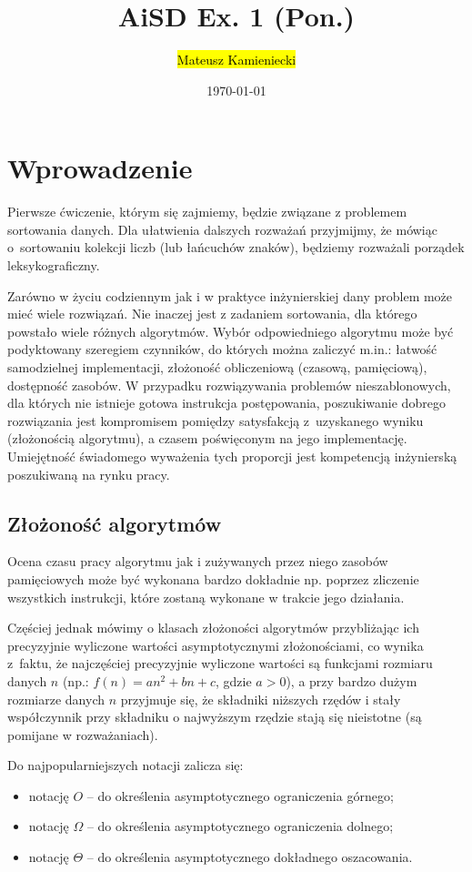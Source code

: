\documentclass[twoside]{article}
\title{AiSD Ex. 1 (Pon.)}
\author{\hl{Mateusz Kamieniecki}}
\date{\today}
\begin{document}
\pagestyle{fancy}
\fancyhead{}
\fancyhead[L]{\@title}
\fancyhead[R]{\@author}
\fancyhead[C]{\@date}

\cfoot{\thepage\ / \pageref{LastPage}}


\newpage

\section{Wprowadzenie}
Pierwsze ćwiczenie, którym się zajmiemy, będzie związane z problemem sortowania danych.
Dla ułatwienia dalszych rozważań przyjmijmy, że mówiąc o~sortowaniu kolekcji liczb (lub łańcuchów znaków), 
będziemy rozważali porządek leksykograficzny.

Zarówno w życiu codziennym jak i w praktyce inżynierskiej dany problem może mieć wiele rozwiązań.
Nie inaczej jest z zadaniem sortowania, dla którego powstało wiele różnych algorytmów.
Wybór odpowiedniego algorytmu może być podyktowany szeregiem czynników, do których można zaliczyć 
m.in.: łatwość samodzielnej implementacji, złożoność obliczeniową (czasową, pamięciową), 
dostępność zasobów.
W przypadku rozwiązywania problemów nieszablonowych, dla których nie istnieje gotowa instrukcja
postępowania, poszukiwanie dobrego rozwiązania jest kompromisem pomiędzy satysfakcją 
z~uzyskanego wyniku (złożonością algorytmu), a czasem poświęconym na jego implementację.
Umiejętność świadomego wyważenia tych proporcji jest kompetencją inżynierską poszukiwaną 
na rynku pracy.

\subsection{Złożoność algorytmów}
Ocena czasu pracy algorytmu jak i zużywanych przez niego zasobów pamięciowych może być wykonana bardzo dokładnie
np. poprzez zliczenie wszystkich instrukcji, które zostaną wykonane w trakcie jego działania.

Częściej jednak mówimy o klasach złożoności algorytmów przybliżając ich precyzyjnie wyliczone wartości
asymptotycznymi złożonościami, co wynika z~faktu, że najczęściej precyzyjnie wyliczone wartości 
są funkcjami rozmiaru danych $n$ (np.: $f(n) = an^2 + bn + c$, gdzie $a > 0$), a przy bardzo dużym rozmiarze danych
$n$ przyjmuje się, że składniki niższych rzędów i stały współczynnik przy składniku o najwyższym rzędzie stają się nieistotne (są pomijane w rozważaniach).

Do najpopularniejszych notacji zalicza się:
\begin{itemize}
    \item notację $O$ -- do określenia asymptotycznego ograniczenia górnego;
    \item notację $\Omega$ -- do określenia asymptotycznego ograniczenia dolnego;
    \item notację $\Theta$ -- do określenia asymptotycznego dokładnego oszacowania.
\end{itemize}
\end{document}
